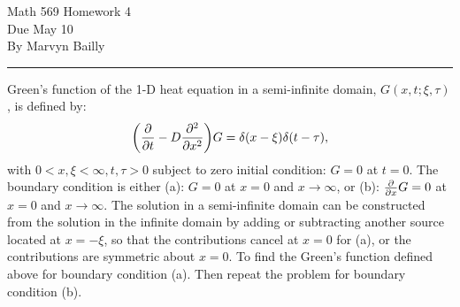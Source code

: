 \documentclass[12pt]{report}
\begin{document}
\large

\begin{center}
 Math 569 Homework 4\\
 Due May 10\\
 By Marvyn Bailly\\
\end{center}

\normalsize

\hrule



\begin{problem}
    Green's function of the 1-D heat equation in a semi-infinite domain, $G(x,t;\xi,\tau)$, is defined by:
    \[
        {\left(\frac{\partial }{\partial t} - D\frac{\partial^{2} }{\partial x^{2}}\right)}G = \delta(x - \xi)\delta(t - \tau),
    \]
    with $0<x,\xi<\infty, t,\tau>0$ subject to zero initial condition: $G=0$ at $t=0$. The boundary condition is either (a): $G=0$ at $x=0$ and $x\to\infty$, or (b): $\frac{\partial }{\partial x}G = 0$ at $x=0$ and $x\to\infty$. The solution in a semi-infinite domain can be constructed from the solution in the infinite domain by adding or subtracting another source located at $x=-\xi$, so that the contributions cancel at $x=0$ for (a), or the contributions are symmetric about $x=0$. To find the Green's function defined above for boundary condition (a). Then repeat the
    problem for boundary condition (b). 
\end{problem}
\end{document}
